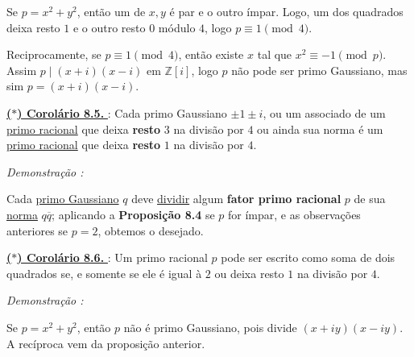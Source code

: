 Se $p = x^2 + y^2$, então um de $x,y$ é par e o outro ímpar.  
Logo, um dos quadrados deixa resto $1$ e o outro resto $0$ módulo $4$, logo $p\equiv 1 \pmod{4}$.  

Reciprocamente, se $p\equiv 1 \pmod{4}$, então existe $x$ tal que $x^2 \equiv -1 \pmod{p}$.  
Assim $p \mid (x+i)(x-i)$ em $\mathbb{Z}[i]$, logo $p$ não pode ser primo Gaussiano, mas sim $p = (x+i)(x-i)$.

\vspace{0.2cm}
\noindent\underline{\underline{\textbf{($\ast$) Corolário 8.5. }}} : Cada primo Gaussiano  $\pm 1 \pm i$, ou um associado de um 
\underline{primo racional} que deixa \textbf{resto} $3$ na divisão por $4$ ou ainda sua norma é um \underline{primo racional} que deixa 
\textbf{resto} $1$ na divisão por $4$.

\vspace{0.2cm}
\noindent\textit{Demonstração : }

Cada \underline{primo Gaussiano} $q$ deve \underline{dividir} algum \textbf{fator primo racional} $p$ de sua \underline{norma} $q \overline{q}$;
aplicando a \textbf{Proposição 8.4} se $p$ for ímpar, e as observações anteriores se $p = 2$, obtemos o desejado.

\vspace{0.2cm}
\noindent\underline{\underline{\textbf{($\ast$) Corolário 8.6. }}} : Um primo racional $p$ pode ser escrito como soma de dois quadrados 
se, e somente se ele é igual à $2$ ou deixa resto $1$ na divisão por $4$.

\vspace{0.2cm}
\noindent\textit{Demonstração : }

Se $p=x^2+y^2$, então $p$ não é primo Gaussiano, pois divide $(x+iy)(x-iy)$.  
A recíproca vem da proposição anterior.
